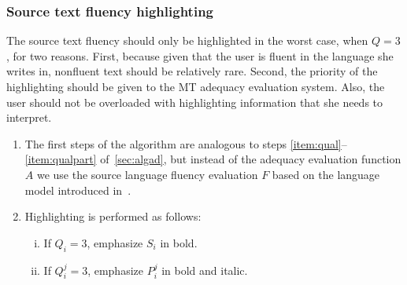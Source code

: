 \documentclass[hidelinks,10pt,letter]{article} %
\begin{document}
    \subsubsection{Source text fluency highlighting}\label{sec:algflu}
    The source text fluency should only be highlighted in the worst case, when $Q=3$, for two reasons. First, because
    given that the user is fluent in the language she writes in, nonfluent text should be relatively rare.
    Second, the priority of the highlighting should be given to the MT adequacy evaluation system. Also, the user should
    not be overloaded with highlighting information that she needs to interpret.
    \begin{enumerate}[(1)]
        \item The first steps of the algorithm are analogous to steps \ref{item:qual}--\ref{item:qualpart} of~\ref{sec:algad}, 
            but instead of the adequacy evaluation function $A$ we use the source language fluency evaluation 
            $F$ based on the language model introduced in~\cite{paulslarge}.
        \item Highlighting is performed as follows:
            \begin{enumerate}[(i)]
                \item If $Q_i=3$, emphasize $S_i$ in bold.
                \item If $Q_i^j=3$, emphasize $P_i^j$ in bold and italic.
            \end{enumerate}
    \end{enumerate}
    
    
    
\end{document}
